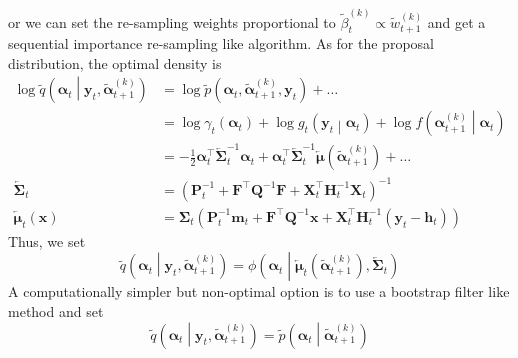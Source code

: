 \documentclass[notitlepage]{article}
\renewcommand{\vec}[1]{\bm{#1}}
\newcommand{\vecLarrow}[1]{\overleftarrow{\vec{#1}}}
\newcommand{\mat}[1]{\mathbf{#1}}
\newcommand{\matLarrow}[1]{\overleftarrow{\mat{#1}}}
\newcommand{\Lparen}[1]{\left( #1\right)}
\newcommand{\Cond}[2]{ #1 \middle\vert  #2}
\newcommand{\optor}[2]{#1\Lparen{#2}}
\newcommand{\optorC}[3]{\optor{#1}{\Cond{#2}{#3}}}
\newcommand{\pdenst}[1]{\optor{\widetilde p}{#1}}
\newcommand{\pdenstC}[2]{\optorC{\widetilde p}{#1}{#2}}
\newcommand{\normaldC}[3]{\optorC{\phi}{#1}{#2,#3}}
\newcommand{\IDAproxC}[2]{\optorC{\widetilde{q}}{#1}{#2}}
\newcommand{\partic}[3]{#1_{#2}^{\Lparen{#3}}}
\newcommand{\particB}[3]{\widetilde{#1}_{#2}^{\Lparen{#3}}}
\begin{document}
%
or we can set the re-sampling weights proportional to %
$\particB{\beta}{t}{k}\propto \particB w{t + 1}k$ and get a sequential importance re-sampling like algorithm. As for the proposal distribution, the optimal density is%
%
\begin{align*}
\log \IDAproxC{\vec\alpha_t}{\vec y_t, \particB{\vec{\alpha}}{t + 1}k}
	&= \log\pdenst{\vec\alpha_t, \particB{\vec\alpha}{t + 1}k, \vec y_t}
	+ \dots \\
	& = \log \gamma_t\Lparen{\vec{\alpha}_t}
	+ \log\optorC{g_t}{\vec y_t}{\vec{\alpha}_t}
	+ \log\optorC{f}{\partic{\vec\alpha}{t+1}k}{\vec\alpha_t} \\
	& = - \frac 12 \vec\alpha_t^\top \matLarrow\Sigma^{-1}_t\vec\alpha_t
		+ \vec\alpha_t^\top \matLarrow\Sigma_t^{-1}\vecLarrow\mu(
			\particB{\vec\alpha}{t + 1}k) + \dots \\
\matLarrow\Sigma_t &= \Lparen{\mat P_t^{-1} + \mat F^\top\mat Q^{-1}\mat F + 
		\mat X_t^\top \mat H^{-1}_t \mat X_t}^{-1} \\
\vecLarrow\mu_t(\vec x) &= \mat\Sigma_t\Lparen{
	\mat P_t^{-1}\vec m_t + \mat F^\top \mat Q^{-1}\vec x + 
	\mat X_t^\top\mat H_t^{-1}(\vec y_t - \vec h_t)}
\end{align*}%
%
Thus, we set %
%
$$
\IDAproxC{\vec\alpha_t}{\vec y_t, \particB{\vec{\alpha}}{t + 1}k} = 
\normaldC{\vec\alpha_t}{
		\vecLarrow\mu_t(\particB{\vec{\alpha}}{t + 1}k)}{
		\matLarrow\Sigma_t}
$$%
% 
A computationally simpler but non-optimal option is to use a bootstrap filter like 
method and set%
%
\begin{equation}\label{eq:bootBW}
\IDAproxC{\vec\alpha_t}{\vec y_t, \particB{\vec{\alpha}}{t + 1}k} = 
	\pdenstC{\vec{\alpha}_t}{\particB{\vec{\alpha}}{t + 1}k}
\end{equation}
\end{document}

